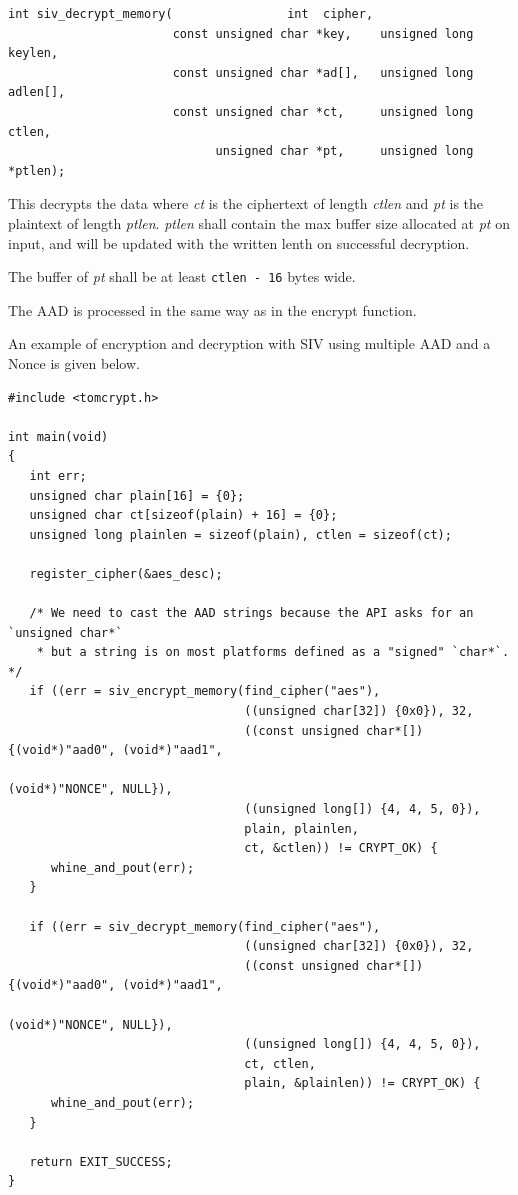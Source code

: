 \documentclass[synpaper]{book}
\begin{document}
\begin{verbatim}
int siv_decrypt_memory(                int  cipher,
                       const unsigned char *key,    unsigned long  keylen,
                       const unsigned char *ad[],   unsigned long  adlen[],
                       const unsigned char *ct,     unsigned long  ctlen,
                             unsigned char *pt,     unsigned long *ptlen);
\end{verbatim}
This decrypts the data where \textit{ct} is the ciphertext of length \textit{ctlen} and \textit{pt} is the plaintext of length \textit{ptlen}.
\textit{ptlen} shall contain the max buffer size allocated at \textit{pt} on input, and will be updated with the
written lenth on successful decryption.

The buffer of \textit{pt} shall be at least \texttt{ctlen - 16} bytes wide.

The AAD is processed in the same way as in the encrypt function.

An example of encryption and decryption with SIV using multiple AAD and a Nonce is given below.

\begin{small}
\begin{verbatim}
#include <tomcrypt.h>

int main(void)
{
   int err;
   unsigned char plain[16] = {0};
   unsigned char ct[sizeof(plain) + 16] = {0};
   unsigned long plainlen = sizeof(plain), ctlen = sizeof(ct);

   register_cipher(&aes_desc);

   /* We need to cast the AAD strings because the API asks for an `unsigned char*`
    * but a string is on most platforms defined as a "signed" `char*`. */
   if ((err = siv_encrypt_memory(find_cipher("aes"),
                                 ((unsigned char[32]) {0x0}), 32,
                                 ((const unsigned char*[]) {(void*)"aad0", (void*)"aad1",
                                                            (void*)"NONCE", NULL}),
                                 ((unsigned long[]) {4, 4, 5, 0}),
                                 plain, plainlen,
                                 ct, &ctlen)) != CRYPT_OK) {
      whine_and_pout(err);
   }

   if ((err = siv_decrypt_memory(find_cipher("aes"),
                                 ((unsigned char[32]) {0x0}), 32,
                                 ((const unsigned char*[]) {(void*)"aad0", (void*)"aad1",
                                                            (void*)"NONCE", NULL}),
                                 ((unsigned long[]) {4, 4, 5, 0}),
                                 ct, ctlen,
                                 plain, &plainlen)) != CRYPT_OK) {
      whine_and_pout(err);
   }

   return EXIT_SUCCESS;
}
\end{verbatim}
\end{small}
\end{document}
